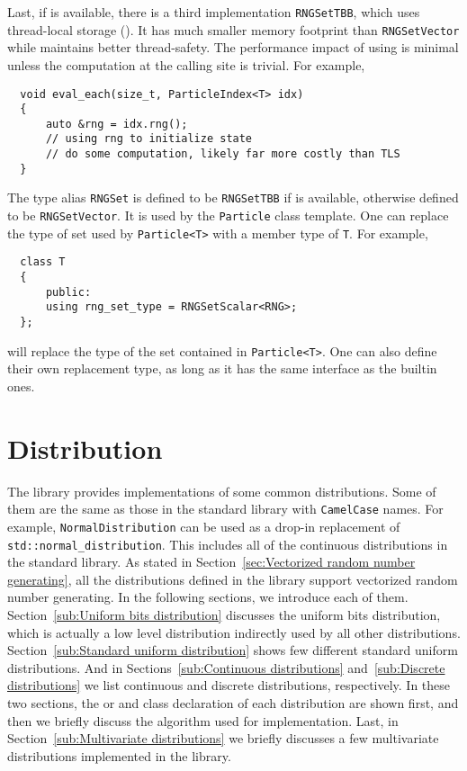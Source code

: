 Last, if \tbb is available, there is a third implementation \verb|RNGSetTBB|,
which uses thread-local storage (\tls). It has much smaller memory footprint
than \verb|RNGSetVector| while maintains better thread-safety. The performance
impact of using \tls is minimal unless the computation at the calling site is
trivial. For example,
\begin{Verbatim}
  void eval_each(size_t, ParticleIndex<T> idx)
  {
      auto &rng = idx.rng();
      // using rng to initialize state
      // do some computation, likely far more costly than TLS
  }
\end{Verbatim}
The type alias \verb|RNGSet| is defined to be \verb|RNGSetTBB| if \tbb is
available, otherwise defined to be \verb|RNGSetVector|. It is used by the
\verb|Particle| class template. One can replace the type of \rng set used by
\verb|Particle<T>| with a member type of \verb|T|. For example,
\begin{Verbatim}
  class T
  {
      public:
      using rng_set_type = RNGSetScalar<RNG>;
  };
\end{Verbatim}
will replace the type of the \rng set contained in \verb|Particle<T>|. One can
also define their own replacement type, as long as it has the same interface as
the builtin ones.

\section{Distribution}
\label{sec:Distribution}

The library provides implementations of some common distributions. Some of them
are the same as those in the standard library with \verb|CamelCase| names. For
example, \verb|NormalDistribution| can be used as a drop-in replacement of
\verb|std::normal_distribution|. This includes all of the continuous
distributions in the standard library. As stated in Section~\ref{sec:Vectorized
  random number generating}, all the distributions defined in the library
support vectorized random number generating. In the following sections, we
introduce each of them. Section~\ref{sub:Uniform bits distribution} discusses
the uniform bits distribution, which is actually a low level distribution
indirectly used by all other distributions. Section~\ref{sub:Standard uniform
  distribution} shows few different standard uniform distributions. And in
Sections~\ref{sub:Continuous distributions} and~\ref{sub:Discrete
  distributions} we list continuous and discrete distributions, respectively.
In these two sections, the \pdf or \pmf and class declaration of each
distribution are shown first, and then we briefly discuss the algorithm used
for implementation. Last, in Section~\ref{sub:Multivariate distributions} we
briefly discusses a few multivariate distributions implemented in the library.

